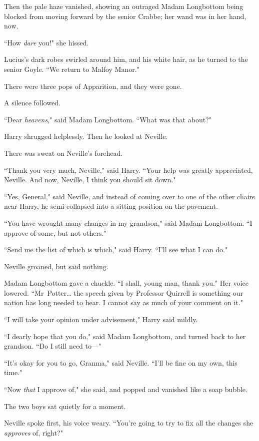 Then the pale haze vanished, showing an outraged Madam Longbottom being blocked from moving forward by the senior Crabbe; her wand was in her hand, now.

``How \emph{dare} you!" she hissed.

Lucius's dark robes swirled around him, and his white hair, as he turned to the senior Goyle. ``We return to Malfoy Manor."

There were three pops of Apparition, and they were gone.

A silence followed.

``Dear \emph{heavens}," said Madam Longbottom. ``What was that about?"

Harry shrugged helplessly. Then he looked at Neville.

There was sweat on Neville's forehead.

``Thank you very much, Neville," said Harry. ``Your help was greatly appreciated, Neville. And now, Neville, I think you should sit down."

``Yes, General," said Neville, and instead of coming over to one of the other chairs near Harry, he semi-collapsed into a sitting position on the pavement.

``You have wrought many changes in my grandson," said Madam Longbottom. ``I approve of some, but not others."

``Send me the list of which is which," said Harry. ``I'll see what I can do."

Neville groaned, but said nothing.

Madam Longbottom gave a chuckle. ``I shall, young man, thank you." Her voice lowered. ``Mr~Potter{\ldots} the speech given by Professor Quirrell is something our nation has long needed to hear. I cannot say as much of your comment on it."

``I will take your opinion under advisement," Harry said mildly.

``I dearly hope that you do," said Madam Longbottom, and turned back to her grandson. ``Do I still need to—"

``It's okay for you to go, Granma," said Neville. ``I'll be fine on my own, this time."

``Now \emph{that} I approve of," she said, and popped and vanished like a soap bubble.

The two boys sat quietly for a moment.

Neville spoke first, his voice weary. ``You're going to try to fix all the changes she \emph{approves} of, right?"

